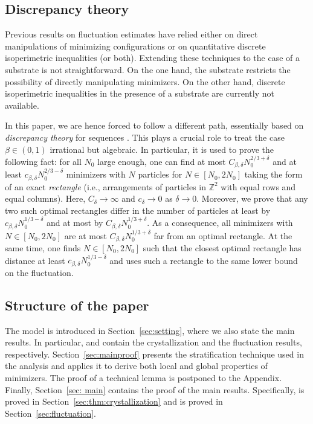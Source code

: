 \documentclass[reqno]{amsart}
\theoremstyle{plain}
\theoremstyle{definition}
\numberwithin{equation}{section}
\newcommand{\Z}{\mathbb{Z}}
\begin{document}
  

\subsection{Discrepancy theory}\label{sec:discrepancy}
Previous results on fluctuation estimates have relied either
on direct manipulations of minimizing configurations
\cite{Davoli15,Mainini-Piovano-schmidt,edo-bernd,Schmidt-disk}
or on quantitative discrete isoperimetric inequalities
\cite{cicalese,Davoli16,FriedrichKreutz, Mainini-Piovano} (or both).  Extending these techniques
to the case of a substrate is not straightforward. On the one hand,
the substrate restricts the possibility of directly manipulating
minimizers. On the other hand, discrete isoperimetric inequalities
in the presence of a substrate are  currently  not available.
 
In this paper, we are hence forced to follow a different path, 
essentially based on {\it discrepancy theory} for sequences
\cite{Kuipers}. This plays a crucial role to treat the
case  $\beta \in (0,1) $ irrational but 
algebraic. In particular, it is used to prove the following fact: for all $N_0$ large enough, one can find at
most  $ C_{\beta,\delta}  N_0^{2/3+ \delta }$ and at least  $  c_{\beta,\delta} N_0^{2/3- \delta }$ 
minimizers with $N$ particles for $N\in [N_0,2N_0]$ taking the form of an
exact {\it rectangle} (i.e., arrangements of particles in $\Z^2$
with equal rows and equal  columns).  Here, $C_\delta \to \infty$ and
$c_\delta \to 0$ as $\delta \to 0$.  Moreover, we prove that any two such
optimal rectangles  differ  in the number
of particles at least by $ c_{\beta,\delta}  N_0^{1/3- \delta }$ and at most by
$  C_{\beta,\delta} N_0^{1/3+ \delta }$. As a consequence, all minimizers with  $N\in
[N_0,2N_0]$ are at most $ C_{\beta,\delta} N_0^{1/3+ \delta }$ far from an optimal
rectangle. At the same time, one finds $N\in [N_0,2N_0]$   such that
the closest optimal rectangle has distance at least
$ c_{\beta,\delta}   N_0^{1/3- \delta }$ and uses such a rectangle to the same lower bound
on the fluctuation.  

 

\subsection{Structure of the paper}
The model is introduced in Section~\ref{sec:setting}, where we also
state the main results. In particular,  and
 contain the crystallization and the
fluctuation results, respectively. Section~\ref{sec:mainproof}
presents the stratification technique used in the analysis and
applies it to derive both local and global properties of
minimizers. The proof of a technical lemma is postponed to the
Appendix. Finally, Section~\ref{sec: main} contains the proof of the 
main results. Specifically,   is
proved in Section~\ref{sec:thm:crystallization} and   is
proved in Section~\ref{sec:fluctuation}.  
 
\end{document}
